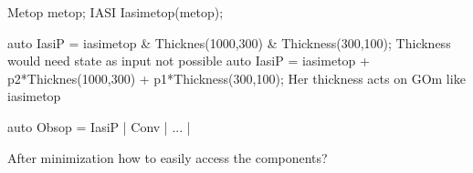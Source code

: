 
Metop metop;
IASI Iasimetop(metop);     

auto IasiP = iasimetop &  Thicknes(1000,300) & Thickness(300,100); Thickness would need state as input not possible
auto IasiP = iasimetop +  p2*Thicknes(1000,300) + p1*Thickness(300,100); Her thickness acts on GOm like  iasimetop 

auto Obsop = IasiP | Conv | ... |  

After minimization how to easily access the components? 
